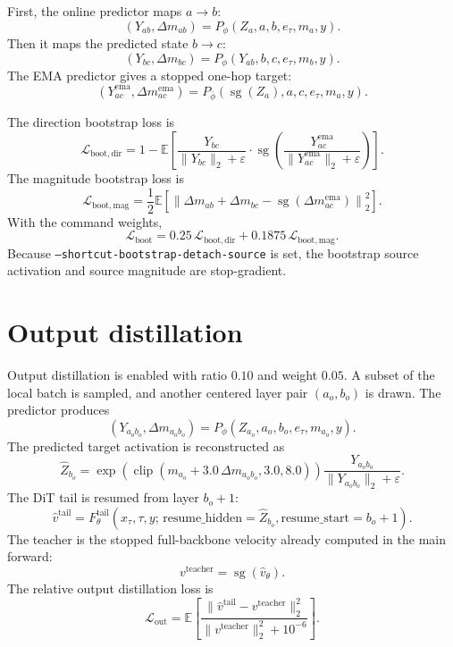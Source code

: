 \documentclass[11pt]{article}
\begin{document}
First, the online predictor maps $a\to b$:
\[
  (Y_{ab},\Delta m_{ab})
  =
  P_\phi(Z_a,a,b,e_\tau,m_a,y).
\]
Then it maps the predicted state $b\to c$:
\[
  (Y_{bc},\Delta m_{bc})
  =
  P_\phi(Y_{ab},b,c,e_\tau,m_b,y).
\]
The EMA predictor gives a stopped one-hop target:
\[
  (Y_{ac}^{\mathrm{ema}},\Delta m_{ac}^{\mathrm{ema}})
  =
  P_{\bar\phi}(\operatorname{sg}(Z_a),a,c,e_\tau,m_a,y).
\]

The direction bootstrap loss is
\[
  \mathcal{L}_{\mathrm{boot,dir}}
  =
  1-
  \mathbb{E}
  \left[
    \frac{Y_{bc}}{\|Y_{bc}\|_2+\varepsilon}
    \cdot
    \operatorname{sg}
    \left(
      \frac{Y_{ac}^{\mathrm{ema}}}
           {\|Y_{ac}^{\mathrm{ema}}\|_2+\varepsilon}
    \right)
  \right].
\]
The magnitude bootstrap loss is
\[
  \mathcal{L}_{\mathrm{boot,mag}}
  =
  \frac{1}{2}
  \mathbb{E}
  \left[
    \left\|
      \Delta m_{ab}+\Delta m_{bc}
      -
      \operatorname{sg}(\Delta m_{ac}^{\mathrm{ema}})
    \right\|_2^2
  \right].
\]
With the command weights,
\[
  \mathcal{L}_{\mathrm{boot}}
  =
  0.25\,\mathcal{L}_{\mathrm{boot,dir}}
  +
  0.1875\,\mathcal{L}_{\mathrm{boot,mag}}.
\]
Because \texttt{--shortcut-bootstrap-detach-source} is set, the bootstrap source
activation and source magnitude are stop-gradient.

\section{Output distillation}

Output distillation is enabled with ratio $0.10$ and weight $0.05$. A subset of
the local batch is sampled, and another centered layer pair $(a_o,b_o)$ is
drawn. The predictor produces
\[
  (Y_{a_ob_o},\Delta m_{a_ob_o})
  =
  P_\phi(Z_{a_o},a_o,b_o,e_\tau,m_{a_o},y).
\]
The predicted target activation is reconstructed as
\[
  \hat Z_{b_o}
  =
  \exp
  \left(
    \operatorname{clip}
    \left(
      m_{a_o}+3.0\,\Delta m_{a_ob_o},
      3.0,8.0
    \right)
  \right)
  \frac{Y_{a_ob_o}}{\|Y_{a_ob_o}\|_2+\varepsilon}.
\]
The DiT tail is resumed from layer $b_o+1$:
\[
  \hat v^{\mathrm{tail}}
  =
  F_\theta^{\mathrm{tail}}
  \left(
    x_\tau,\tau,y;\,
    \mathrm{resume\_hidden}=\hat Z_{b_o},
    \mathrm{resume\_start}=b_o+1
  \right).
\]
The teacher is the stopped full-backbone velocity already computed in the main
forward:
\[
  v^{\mathrm{teacher}}=\operatorname{sg}(\hat v_\theta).
\]
The relative output distillation loss is
\[
  \mathcal{L}_{\mathrm{out}}
  =
  \mathbb{E}
  \left[
    \frac{
      \|\hat v^{\mathrm{tail}}-v^{\mathrm{teacher}}\|_2^2
    }{
      \|v^{\mathrm{teacher}}\|_2^2+10^{-6}
    }
  \right].
\]
\end{document}
